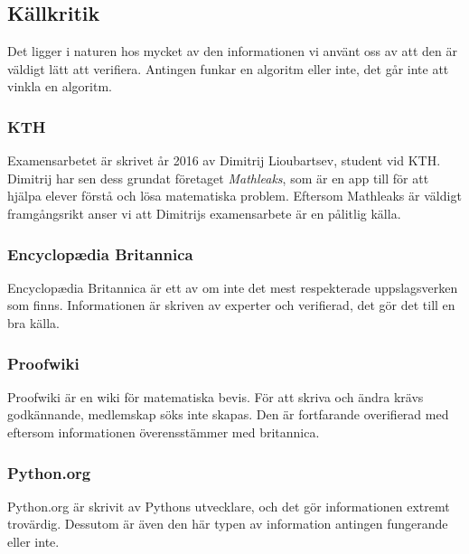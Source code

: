 \documentclass[12pt,a4paper]{article}
\begin{document}
\subsection{Källkritik}
Det ligger i naturen hos mycket av den informationen vi använt oss av att den är väldigt lätt att verifiera. Antingen funkar en algoritm eller inte, det går inte att vinkla en algoritm. 
\subsubsection{KTH}
Examensarbetet är skrivet år 2016 av Dimitrij Lioubartsev, student vid KTH. Dimitrij har sen dess grundat företaget \textit{Mathleaks}, som är en app till för att hjälpa elever förstå och lösa matematiska problem. Eftersom Mathleaks är väldigt framgångsrikt anser vi att Dimitrijs examensarbete är en pålitlig källa.
\subsubsection{Encyclopædia Britannica}
Encyclopædia Britannica är ett av om inte det mest respekterade uppslagsverken som finns. Informationen är skriven av experter och verifierad, det gör det till en bra källa. 
\subsubsection{Proofwiki}
Proofwiki är en wiki för matematiska bevis. För att skriva och ändra krävs godkännande, medlemskap söks inte skapas. Den är fortfarande overifierad med eftersom informationen överensstämmer med britannica.
\subsubsection{Python.org}
Python.org är skrivit av Pythons utvecklare, och det gör informationen extremt trovärdig. Dessutom är även den här typen av information antingen fungerande eller inte. 
\end{document}
